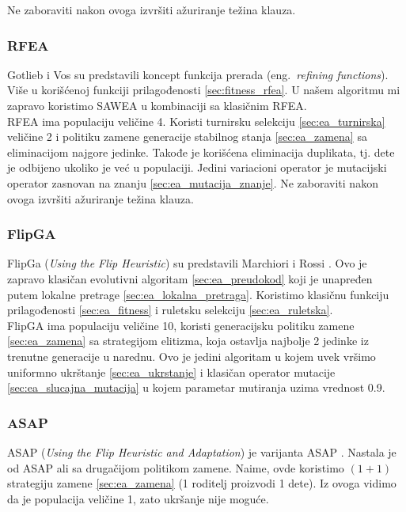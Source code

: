\documentclass{article}
\begin{document}
Ne zaboraviti nakon ovoga izvršiti ažuriranje težina klauza.


\subsubsection{RFEA}
\label{sec:ea_rfea}
Gotlieb i Vos \cite{ea_with_table, ea_without_table} su predstavili koncept funkcija prerada (eng.~{\em refining functions}). Više u korišćenoj funkciji prilagođenosti \ref{sec:fitness_rfea}.
U našem algoritmu mi zapravo koristimo SAWEA u kombinaciji sa klasičnim RFEA. \\

RFEA ima populaciju veličine 4. Koristi turnirsku selekciju \ref{sec:ea_turnirska} veličine 2 i politiku zamene generacije stabilnog stanja \ref{sec:ea_zamena} sa eliminacijom najgore jedinke. Takođe je korišćena eliminacija duplikata, tj. dete je odbijeno ukoliko je već u populaciji.
Jedini variacioni operator je mutacijski operator zasnovan na znanju \ref{sec:ea_mutacija_znanje}.
Ne zaboraviti nakon ovoga izvršiti ažuriranje težina klauza.


\subsubsection{FlipGA}
\label{sec:ea_flipga}
FlipGa (\textit{Using the Flip Heuristic}) su predstavili Marchiori i Rossi \cite{ea_with_table}. Ovo je zapravo klasičan evolutivni algoritam \ref{sec:ea_preudokod}  koji je unapređen putem lokalne pretrage \ref{sec:ea_lokalna_pretraga}. Koristimo klasičnu funkciju prilagođenosti \ref{sec:ea_fitness} i ruletsku selekciju \ref{sec:ea_ruletska}. \\

FlipGA ima populaciju veličine 10, koristi generacijsku politiku zamene \ref{sec:ea_zamena} sa strategijom elitizma, koja ostavlja najbolje 2 jedinke iz trenutne generacije u narednu.	Ovo je jedini algoritam u kojem uvek vršimo uniformno ukrštanje \ref{sec:ea_ukrstanje} i klasičan operator mutacije \ref{sec:ea_slucajna_mutacija} u kojem parametar mutiranja uzima vrednost 0.9.
 
\subsubsection{ASAP}
\label{sec:ea_asap}
ASAP (\textit{Using the Flip Heuristic and Adaptation}) je varijanta ASAP \cite{ea_with_table}. Nastala je od ASAP ali sa drugačijom politikom zamene. Naime, ovde koristimo
$(1+1)$ strategiju zamene \ref{sec:ea_zamena} (1 roditelj proizvodi 1 dete). Iz ovoga vidimo da je populacija veličine 1, zato ukršanje nije moguće. \\
\end{document}
